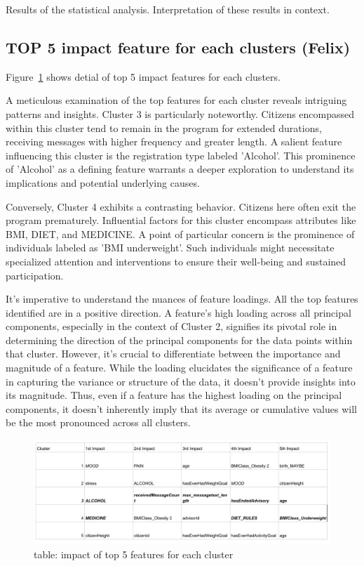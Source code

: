 \documentclass[12pt]{article}
\begin{document}
Results of the statistical analysis.
Interpretation of these results in context.

\subsection{TOP 5 impact feature for each clusters (Felix)}

Figure~\ref{fig:table} shows detial of top 5 impact features for each clusters.

A meticulous examination of the top features for each cluster reveals intriguing patterns and insights. Cluster 3 is particularly noteworthy. Citizens encompassed within this cluster tend to remain in the program for extended durations, receiving messages with higher frequency and greater length. A salient feature influencing this cluster is the registration type labeled 'Alcohol'. This prominence of 'Alcohol' as a defining feature warrants a deeper exploration to understand its implications and potential underlying causes.

Conversely, Cluster 4 exhibits a contrasting behavior. Citizens here often exit the program prematurely. Influential factors for this cluster encompass attributes like BMI, DIET, and MEDICINE. A point of particular concern is the prominence of individuals labeled as 'BMI underweight'. Such individuals might necessitate specialized attention and interventions to ensure their well-being and sustained participation.

It's imperative to understand the nuances of feature loadings. All the top features identified are in a positive direction. A feature's high loading across all principal components, especially in the context of Cluster 2, signifies its pivotal role in determining the direction of the principal components for the data points within that cluster. However, it's crucial to differentiate between the importance and magnitude of a feature. While the loading elucidates the significance of a feature in capturing the variance or structure of the data, it doesn't provide insights into its magnitude. Thus, even if a feature has the highest loading on the principal components, it doesn't inherently imply that its average or cumulative values will be the most pronounced across all clusters.

\begin{figure}[h]
  \centering
  \includegraphics[width=0.7\linewidth]{images/table.png}
  \caption{table: impact of top 5 features for each cluster}
  \label{fig:table}
  \end{figure}
\end{document}

